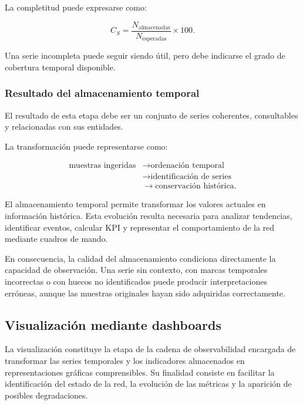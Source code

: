 La completitud puede expresarse como:

\[
    C_S
    =
    \frac{
        N_{\mathrm{almacenadas}}
    }{
        N_{\mathrm{esperadas}}
    }
    \times
    100.
\]

Una serie incompleta puede seguir siendo útil, pero debe indicarse el
grado de cobertura temporal disponible.


\subsubsection*{Resultado del almacenamiento temporal}

El resultado de esta etapa debe ser un conjunto de series coherentes,
consultables y relacionadas con sus entidades.

La transformación puede representarse como:

\[
\begin{aligned}
    \text{muestras ingeridas}
    &\longrightarrow
    \text{ordenación temporal}\\
    &\longrightarrow
    \text{identificación de series}\\
    &\longrightarrow
    \text{conservación histórica}.
\end{aligned}
\]

El almacenamiento temporal permite transformar los valores actuales en
información histórica. Esta evolución resulta necesaria para analizar
tendencias, identificar eventos, calcular KPI y representar el
comportamiento de la red mediante cuadros de mando.

En consecuencia, la calidad del almacenamiento condiciona directamente
la capacidad de observación. Una serie sin contexto, con marcas temporales
incorrectas o con huecos no identificados puede producir interpretaciones
erróneas, aunque las muestras originales hayan sido adquiridas
correctamente.

\subsection{Visualización mediante dashboards}
\label{subsec:visualizacion-dashboards}

La visualización constituye la etapa de la cadena de observabilidad
encargada de transformar las series temporales y los indicadores
almacenados en representaciones gráficas comprensibles. Su finalidad
consiste en facilitar la identificación del estado de la red, la
evolución de las métricas y la aparición de posibles degradaciones.

